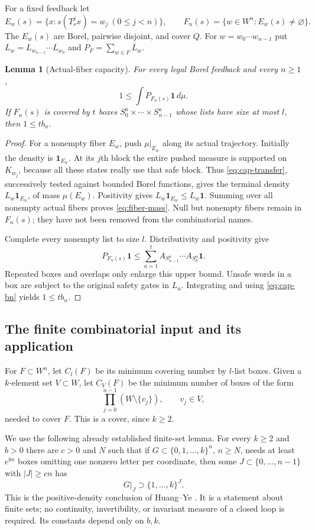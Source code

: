 \documentclass[11pt,reqno]{amsart}
\numberwithin{equation}{section}
\newtheorem{lemma}[theorem]{Lemma}
\theoremstyle{definition}
\newcommand{\one}{\mathbf 1}
\begin{document}
For a fixed feedback let
\[
 E_w(s)=\{x:s(T_s^jx)=w_j\ (0\le j<n)\},\qquad
 F_n(s)=\{w\in W^n:E_w(s)\ne\varnothing\}.
\]
The $E_w(s)$ are Borel, pairwise disjoint, and cover $Q$.
For $w=w_0\cdots w_{n-1}$ put
$L_w=L_{w_{n-1}}\cdots L_{w_0}$ and
$P_F=\sum_{w\in F}L_w$.

\begin{lemma}[Actual-fiber capacity]\label{lem:fiber-cap}
For every legal Borel feedback and every $n\ge1$,
\begin{equation}\label{eq:fiber-mass}
 1\le\int P_{F_n(s)}\one\,d\mu.
\end{equation}
If $F_n(s)$ is covered by $t$ boxes
$S^a_0\times\cdots\times S^a_{n-1}$ whose lists have size at
most $l$, then $1\le t b_n$.
\end{lemma}
\begin{proof}
For a nonempty fiber $E_w$, push $\mu|_{E_w}$ along its actual
trajectory. Initially the density is $\one_{E_w}$. At its $j$th
block the entire pushed measure is supported on $K_{w_j}$, because
all these states really use that safe block. Thus
\eqref{eq:cap-transfer}, successively tested against bounded Borel
functions, gives the terminal density $L_w\one_{E_w}$, of mass
$\mu(E_w)$. Positivity gives
$L_w\one_{E_w}\le L_w\one$. Summing over all nonempty actual
fibers proves \eqref{eq:fiber-mass}. Null but nonempty fibers remain
in $F_n(s)$; they have not been removed from the combinatorial names.

Complete every nonempty list to size $l$. Distributivity and positivity
give
\[
 P_{F_n(s)}\one\le\sum_{a=1}^t
 A_{S^a_{n-1}}\cdots A_{S^a_0}\one.
\]
Repeated boxes and overlaps only enlarge this upper bound. Unsafe
words in a box are subject to the original safety gates in $L_u$.
Integrating and using \eqref{eq:cap-bn} yields $1\le tb_n$.
\end{proof}

\subsection{The finite combinatorial input and its application}
For $F\subset W^n$, let $C_l(F)$ be its minimum covering number by
$l$-list boxes. Given a $k$-element set $V\subset W$, let $C_V(F)$
be the minimum number of boxes of the form
\[
 \prod_{j=0}^{n-1}(W\setminus\{v_j\}),\qquad v_j\in V,
\]
needed to cover $F$. This is a cover, since $k\ge2$.

We use the following already established finite-set lemma. For every
$k\ge2$ and $b>0$ there are $c>0$ and $N$ such that if
$G\subset\{0,1,\ldots,k\}^n$, $n\ge N$, needs at least
$e^{bn}$ boxes omitting one nonzero letter per coordinate, then some
$J\subset\{0,\ldots,n-1\}$ with $|J|\ge cn$ has
\begin{equation}\label{eq:HY-cube}
 G|_J\supset\{1,\ldots,k\}^{J}.
\end{equation}
This is the positive-density conclusion of Huang--Ye
\cite[Lemma~4.1 and Remark~4.2, pp.~1701--1705]{HuangYe2009}.
It is a statement about finite sets; no continuity, invertibility, or
invariant measure of a closed loop is required. Its constants depend
only on $b,k$.
\end{document}
